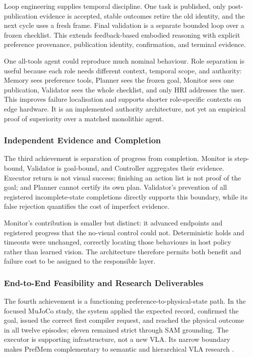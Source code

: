 \documentclass{article}
\begin{document}
Loop engineering supplies temporal discipline. One task is published, only
post-publication evidence is accepted, stable outcomes retire the old identity,
and the next cycle uses a fresh frame. Final validation is a separate bounded
loop over a frozen checklist. This extends feedback-based embodied reasoning
\parencite{ahn2022saycan,huang2022innermonologue,yao2023react} with explicit
preference provenance, publication identity, confirmation, and terminal
evidence.

One all-tools agent could reproduce much nominal behaviour. Role separation is
useful because each role needs different context, temporal scope, and authority:
Memory sees preference tools, Planner sees the frozen goal, Monitor sees one
publication, Validator sees the whole checklist, and only HRI addresses the
user. This improves failure localisation and supports shorter role-specific
contexts on edge hardware. It is an implemented authority architecture, not yet
an empirical proof of superiority over a matched monolithic agent.

\subsubsection{Independent Evidence and Completion}

The third achievement is separation of progress from completion. Monitor is
step-bound, Validator is goal-bound, and Controller aggregates their evidence.
Executor return is not visual success; finishing an action list is not proof of
the goal; and Planner cannot certify its own plan. Validator's prevention of all
registered incomplete-state completions directly supports this boundary, while
its false rejection quantifies the cost of imperfect evidence.

Monitor's contribution is smaller but distinct: it advanced endpoints and
registered progress that the no-visual control could not. Deterministic holds
and timeouts were unchanged, correctly locating those behaviours in host policy
rather than learned vision. The architecture therefore permits both benefit and
failure cost to be assigned to the responsible layer.

\subsubsection{End-to-End Feasibility and Research Deliverables}

The fourth achievement is a functioning preference-to-physical-state path. In
the focused MuJoCo study, the system applied the expected record, confirmed the
goal, issued the correct first compiler request, and reached the physical outcome
in all twelve episodes; eleven remained strict through SAM grounding. The
executor is supporting infrastructure, not a new VLA. Its narrow boundary makes
PrefMem complementary to semantic and hierarchical VLA research
\parencite{ni2026semanticvla,shi2025hirobot,yang2025agenticrobot,li2026roboclaw}.
\end{document}

